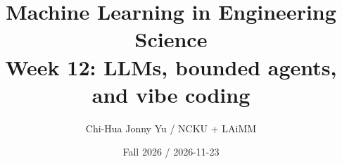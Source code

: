 \documentclass[11pt,oneside]{book}
\begin{document}
\title{Machine Learning in Engineering Science\\\large Week 12: LLMs, bounded agents, and vibe coding}\author{Chi-Hua Jonny Yu / NCKU + LAiMM}\date{Fall 2026 / 2026-11-23}\maketitle

\end{document}
